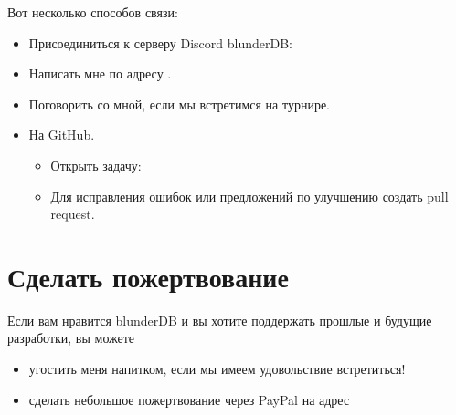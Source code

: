 \documentclass[letterpaper,10pt,russian]{sphinxmanual}
\begin{document}
\sphinxAtStartPar
Вот несколько способов связи:
\begin{itemize}
\item {} 
\sphinxAtStartPar
Присоединиться к серверу Discord blunderDB: 

\item {} 
\sphinxAtStartPar
Написать мне по адресу .

\item {} 
\sphinxAtStartPar
Поговорить со мной, если мы встретимся на турнире.

\item {} 
\sphinxAtStartPar
На GitHub.
\begin{itemize}
\item {} 
\sphinxAtStartPar
Открыть задачу: 

\item {} 
\sphinxAtStartPar
Для исправления ошибок или предложений по улучшению создать pull request.

\end{itemize}

\end{itemize}


\chapter{Сделать пожертвование}
\label{\detokenize{index:faire-un-don}}
\sphinxAtStartPar
Если вам нравится blunderDB и вы хотите поддержать прошлые и будущие разработки, вы можете
\begin{itemize}
\item {} 
\sphinxAtStartPar
угостить меня напитком, если мы имеем удовольствие встретиться!

\item {} 
\sphinxAtStartPar
сделать небольшое пожертвование через PayPal на адрес 

\end{itemize}
\end{document}
